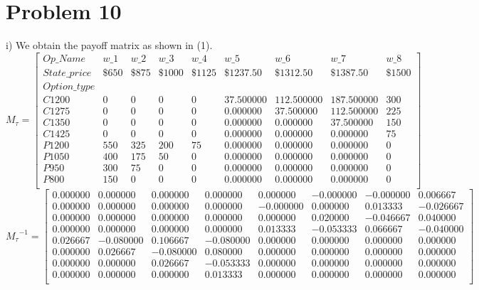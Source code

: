 \documentclass{article}
\begin{document}
\section*{Problem 10}
i) We obtain the payoff matrix as shown in (1).
\begin{equation}
M_{\tau}=%
\begin{bmatrix}{}
 Op\_Name & w\_1 & w\_2 & w\_3 & w\_4 & w\_5 & w\_6 & w\_7 & w\_8 \\ 
State\_price & \$650 & \$875 & \$1000 & \$1125 & \$1237.50 & \$1312.50 & \$1387.50 & \$1500  \\  
Option\_type &&&&&&&\\
 C1200 &       0 &       0 &       0 &       0 & 37.500000 & 112.500000 & 187.500000 &     300 \\ 
  C1275 &       0 &       0 &       0 &       0 & 0.000000 & 37.500000 & 112.500000 &     225 \\ 
  C1350 &       0 &       0 &       0 &       0 & 0.000000 & 0.000000 & 37.500000 &     150 \\ 
  C1425 &       0 &       0 &       0 &       0 & 0.000000 & 0.000000 & 0.000000 &      75 \\ 
  P1200 &     550 &     325 &     200 &      75 & 0.000000 & 0.000000 & 0.000000 &       0 \\ 
  P1050 &     400 &     175 &      50 &       0 & 0.000000 & 0.000000 & 0.000000 &       0 \\ 
  P950 &     300 &      75 &       0 &       0 & 0.000000 & 0.000000 & 0.000000 &       0 \\ 
  P800 &     150 &       0 &       0 &       0 & 0.000000 & 0.000000 & 0.000000 &       0 \\ 
  \end{bmatrix}
\end{equation}
\begin{equation}
{M_{\tau}}^{-1}=%
\begin{bmatrix}{}
 0.000000 & 0.000000 & 0.000000 & 0.000000 & 0.000000 & -0.000000 & -0.000000 & 0.006667 \\ 
  0.000000 & 0.000000 & 0.000000 & 0.000000 & -0.000000 & 0.000000 & 0.013333 & -0.026667 \\ 
  0.000000 & 0.000000 & 0.000000 & 0.000000 & 0.000000 & 0.020000 & -0.046667 & 0.040000 \\ 
  0.000000 & 0.000000 & 0.000000 & 0.000000 & 0.013333 & -0.053333 & 0.066667 & -0.040000 \\ 
  0.026667 & -0.080000 & 0.106667 & -0.080000 & 0.000000 & 0.000000 & 0.000000 & 0.000000 \\ 
  0.000000 & 0.026667 & -0.080000 & 0.080000 & 0.000000 & 0.000000 & 0.000000 & 0.000000 \\ 
  0.000000 & 0.000000 & 0.026667 & -0.053333 & 0.000000 & 0.000000 & 0.000000 & 0.000000 \\ 
  0.000000 & 0.000000 & 0.000000 & 0.013333 & 0.000000 & 0.000000 & 0.000000 & 0.000000 \\ 
  \end{bmatrix}
\end{equation}
\end{document}

